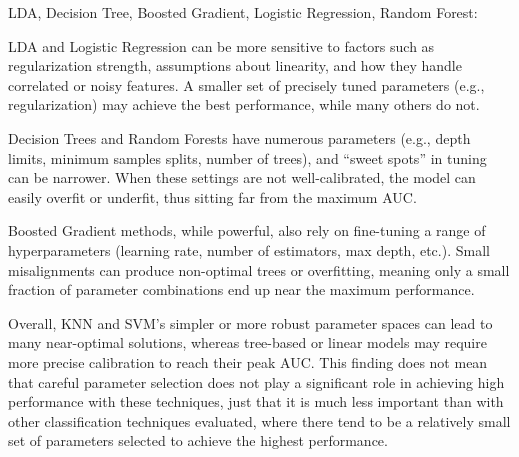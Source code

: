 \documentclass[letterpaper, notitlepage]{report}
\begin{document}
LDA, Decision Tree, Boosted Gradient, Logistic Regression, Random Forest:

LDA and Logistic Regression can be more sensitive to factors such as regularization strength, assumptions about linearity, and how they handle correlated or noisy features. A smaller set of precisely tuned parameters (e.g., regularization) may achieve the best performance, while many others do not.

Decision Trees and Random Forests have numerous parameters (e.g., depth limits, minimum samples splits, number of trees), and “sweet spots” in tuning can be narrower. When these settings are not well-calibrated, the model can easily overfit or underfit, thus sitting far from the maximum AUC.

Boosted Gradient methods, while powerful, also rely on fine-tuning a range of hyperparameters (learning rate, number of estimators, max depth, etc.). Small misalignments can produce non-optimal trees or overfitting, meaning only a small fraction of parameter combinations end up near the maximum performance.

Overall, KNN and SVM’s simpler or more robust parameter spaces can lead to many near-optimal solutions, whereas tree-based or linear models may require more precise calibration to reach their peak AUC. This finding does not mean that careful parameter selection does not play a significant role in achieving high performance with these techniques, just that it is much less important than with other classification techniques evaluated, where there tend to be a relatively small set of parameters selected to achieve the highest performance.

\end{document}
